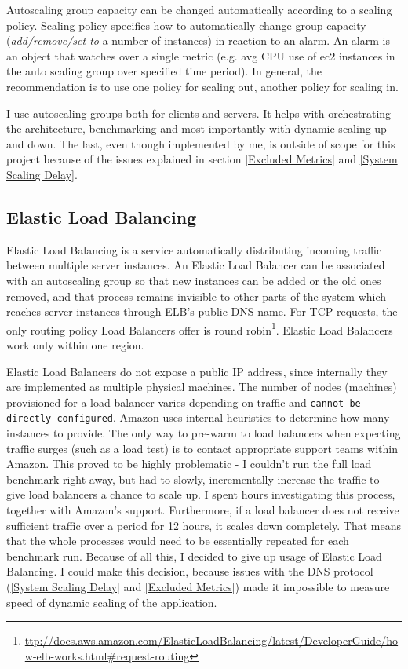 \documentclass{uvamscse}
\begin{document}
Autoscaling group capacity can be changed automatically according to a scaling policy. Scaling policy specifies how to automatically change group capacity (\textit{add/remove/set to} a number of instances) in reaction to an alarm. An alarm is an object that watches over a single metric (e.g. avg CPU use of ec2 instances in the auto scaling group over specified time period). In general, the recommendation is to use one policy for scaling out, another policy for scaling in.

I use autoscaling groups both for clients and servers. It helps with orchestrating the architecture, benchmarking and most importantly with dynamic scaling up and down. The last, even though implemented by me, is outside of scope for this project because of the issues explained in section \ref{Excluded Metrics} and \ref{System Scaling Delay}.

\subsection{Elastic Load Balancing}\label{Load balancing}
Elastic Load Balancing is a service automatically distributing incoming traffic between multiple server instances. An Elastic Load Balancer can be associated with an autoscaling group so that new instances can be added or the old ones removed, and that process remains invisible to other parts of the system which reaches server instances through ELB's public DNS name. For TCP requests, the only routing policy Load Balancers offer is round robin\footnote{\url{ttp://docs.aws.amazon.com/ElasticLoadBalancing/latest/DeveloperGuide/how-elb-works.html\#request-routing}}. Elastic Load Balancers work only within one region.

Elastic Load Balancers do not expose a public IP address, since internally they are implemented as multiple physical machines. The number of nodes (machines) provisioned for a load balancer varies depending on traffic and \texttt{cannot be directly configured}. Amazon uses internal heuristics to determine how many instances to provide. The only way to pre-warm to load balancers when expecting traffic surges (such as a load test) is to contact appropriate support teams within Amazon. This proved to be highly problematic - I couldn't run the full load benchmark right away, but had to slowly, incrementally increase the traffic to give load balancers a chance to scale up. I spent hours investigating this process, together with Amazon's support. Furthermore, if a load balancer does not receive sufficient traffic over a period for 12 hours, it scales down completely. That means that the whole processes would need to be essentially repeated for each benchmark run. Because of all this, I decided to give up usage of Elastic Load Balancing. I could make this decision, because issues with the DNS protocol (\ref{System Scaling Delay} and \ref{Excluded Metrics}) made it impossible to measure speed of dynamic scaling of the application.
\end{document}
